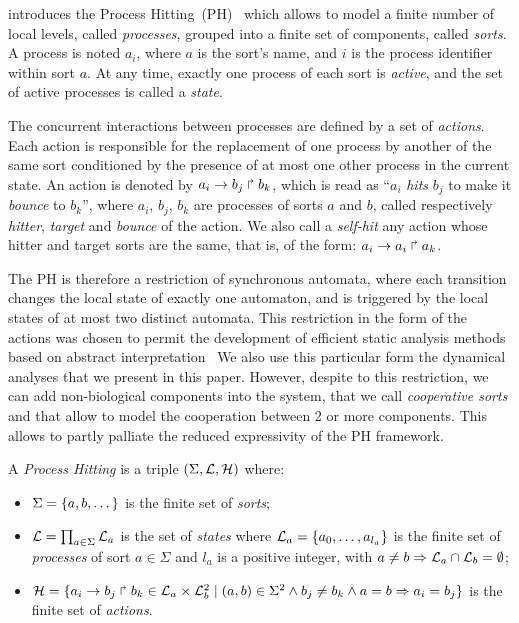 \label{sec:prem-def}

 introduces the Process Hitting~(PH)~\cite{PMR10-TCSB}
which allows to model a finite number of local levels,
called \emph{processes},
grouped into a finite set of components, called \emph{sorts}.
A process is noted $a_i$, where $a$ is the sort's name,
and $i$ is the process identifier within sort $a$.
At any time, exactly one process of each sort is \emph{active},
and the set of active processes is called a \emph{state}.

The concurrent interactions between processes are defined by a set of \emph{actions}.
Each action is responsible for the replacement of one process by another of the same sort
conditioned by the presence of at most one other process in the current state.
An action is denoted by $a_i\rightarrow b_j\Rsh b_k$, which is read as
``$a_i$ \emph{hits} $b_j$ to make it \emph{bounce} to $b_k$'',
where $a_i$, $b_j$, $b_k$ are processes of sorts $a$ and $b$,
called respectively \emph{hitter}, \emph{target} and
\emph{bounce} of the action.
We also call a \emph{self-hit} any action whose hitter and target sorts are the same,
that is, of the form: $a_i\rightarrow a_i\Rsh a_k$.

The PH is therefore a restriction of synchronous automata, where each transition
changes the local state of exactly one automaton,
and is triggered by the local states of at most two distinct automata.
This restriction in the form of the actions was chosen to permit
the development of efficient static analysis methods
based on abstract interpretation~\cite{PMR12-MSCS}
We also use this particular form the dynamical analyses that we present in this paper.
However, despite to this restriction, we can add non-biological components into the system, that we call \emph{cooperative sorts} and that allow to model the cooperation between 2 or more components. This allows to partly palliate the reduced expressivity of the PH framework.

\begin{definition}\label{def:PH}
  A \emph{Process Hitting} is a triple $(\Sigma,\mathcal{L},\mathcal{H})$ where:
  \begin{itemize}
    \item  $\Sigma = \{a,b,\dots\}$ is the finite set of \emph{sorts};
    \item  $\mathcal{L} = \prod_{a\in\Sigma} \mathcal{L}_a$ is the set of \emph{states} where
      $\mathcal{L}_a = \{a_0,\dots,a_{l_a}\}$
      is the finite set of \emph{processes} of sort $a\in\Sigma$
      and $l_a$ is a positive integer, with $a\neq b\Rightarrow \mathcal{L}_a \cap \mathcal{L}_b = \emptyset$;
    \item  $\mathcal{H} = \{ a_i\rightarrow b_j\Rsh b_k \in \mathcal{L}_a \times \mathcal{L}_b^2 \mid
      (a,b) \in \Sigma^2 \wedge b_j\neq b_k \wedge a=b\Rightarrow a_i=b_j\}$
      is the finite set of \emph{actions}.
  \end{itemize}
\end{definition}

